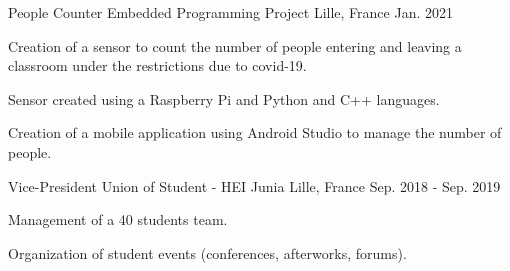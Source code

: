 

\begin{cventries}

  \cventry
    {People Counter} %
    {Embedded Programming Project} %
    {Lille, France} %
    {Jan. 2021} %
    {
      \begin{cvitems} %
        \item {Creation of a sensor to count the number of people entering and leaving a classroom under the restrictions due to covid-19.}
        \item {Sensor created using a Raspberry Pi and Python and C++ languages.}
        \item {Creation of a mobile application using Android Studio to manage the number of people.}
      \end{cvitems}
    }

  \cventry
    {Vice-President} %
    {Union of Student - HEI Junia} %
    {Lille, France} %
    {Sep. 2018 - Sep. 2019} %
    {
      \begin{cvitems} %
        \item {Management of a 40 students team.}
        \item {Organization of student events (conferences, afterworks, forums).}
      \end{cvitems}
    }

\end{cventries}
